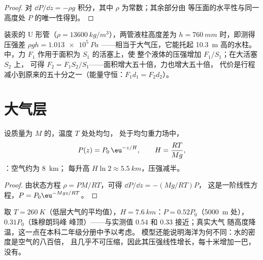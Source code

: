 \begin{proof}
对 $\dd P/\dd z = -\rho g$ 积分，其中 $\rho$ 为常数；其余部分由
等压面的水平性与同一高度处 $P$ 的唯一性得到。
\end{proof}

\begin{example}[压强计与液压机]\label{ex:b1:fluid-statics:manometer}
装汞的 U 形管（$\rho = \qty{13600}{kg/m^3}$），两管液柱高度差为
$h = \qty{760}{mm}$ 时，即测得压强差 $\rho gh = \qty{1.013e5}{Pa}$
——相当于大气压，它能托起 \qty{10.3}{m} 高的水柱。
中，力 $F_1$ 作用于面积为 $S_1$ 的活塞上，使
整个液体的压强增加 $F_1/S_1$；在大活塞 $S_2$ 上，
可得 $F_2 = F_1S_2/S_1$——面积增大五十倍，力也增大五十倍，
代价是行程减小到原来的五十分之一（能量守恒：$F_1d_1 = F_2d_2$）。
\end{example}

\section{大气层}

\begin{proposition}[等温大气]\label{prop:b1:fluid-statics:atmosphere}
设质量为 $M$ 的，温度 $T$ 处处均匀，
处于均匀重力场中，
\[
P(z) = P_0\,\eu^{-z/H}, \qquad H = \frac{RT}{Mg} ,
\]
\emph{}：空气约为 \qty{8}{km}；
每升高 $H\ln2 \approx \qty{5.5}{km}$，压强减半。
\end{proposition}

\begin{proof}
由状态方程 $\rho = PM/RT$，可得 $\dd P/\dd z = -(Mg/RT)P$，
这是一阶线性方程，$P = P_0\eu^{-Mgz/RT}$。
\end{proof}

\begin{example}[稀薄空气]\label{ex:b1:fluid-statics:altitude}
取 $T = \qty{260}{K}$（低层大气的平均值），$H =
\qty{7.6}{km}$：$P = 0.52P_0$（\qty{5000}{m} 处），$0.31P_0$（珠穆朗玛峰
峰顶）——与实测值 $0.54$ 和 $0.33$ 接近；真实大气
随高度降温，这一点在本科二年级分册中予以考虑。
模型还能说明海洋为何不同：水的密度是空气的八百倍，
且几乎不可压缩，因此其压强线性增长，每十米增加一巴，
没有。
\end{example}

